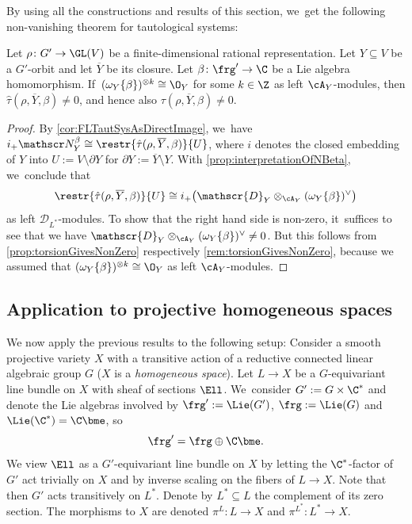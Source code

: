 By using all the constructions and results of this section, we~get the following non-vanishing theorem for tautological systems:

\begin{thm} \label{thm:nonZeroGeneralSetup}
Let $\rho \colon G' \to \GL(V)$ be a finite-dimensional rational representation. Let $Y \subseteq V$ be a $G'$-orbit and let $\overline{Y}$ be its closure. Let $\beta \colon \frg' \to \C$ be a Lie algebra homomorphism. If~$(\omega_Y\{\beta\})^{\otimes k} \cong \O_Y$ for some $k\in \Z$ as left $\cA_Y$\nobreakdash-mod\-ules,
then $\hat{\tau}(\rho, \overline{Y}, \beta) \neq 0$, and hence also $\tau(\rho, \overline{Y}, \beta) \neq 0$.
\end{thm}

\begin{proof}
By \cref{cor:FLTautSysAsDirectImage}, we~have $i_+ \mathscr N_Y^{\beta} \cong \restr{\hat\tau(\rho,\overline Y, \beta)}{U}$, where $i$ denotes the closed embedding of $Y$ into $U := V \setminus \partial Y$ for $\partial Y := \overline Y \setminus Y$. With \cref{prop:interpretationOfNBeta}, we~conclude that
\[
\restr{\hat{\tau}(\rho,\overline Y,\beta)}{U} \cong i_+\big(\mathscr{D}_{Y} \otimes_{\cA_{Y}} (\omega_{Y}\{\beta\})^\vee\big)
\]
as left $\mathscr{D}_{L^*}$\nobreakdash-mod\-ules. To show that the right hand side is non-zero, it~suffices to see that we have $\mathscr{D}_{Y} \otimes_{\cA_{Y}} (\omega_{Y}\{\beta\})^\vee \neq 0$.
But this follows from \cref{prop:torsionGivesNonZero} respectively \cref{rem:torsionGivesNonZero}, because we assumed that $(\omega_{Y}\{\beta\})^{\otimes k} \cong \O_Y$ as left $\cA_Y$\nobreakdash-mod\-ules.
\end{proof}

\subsection{Application to projective homogeneous spaces} \label{ssec:canSheafOnLineBdl}

We now apply the previous results to the following setup: Consider a smooth projective variety $X$ with a transitive action of a reductive connected linear algebraic group $G$ (\ie $X$ is a \emph{homogeneous space}). Let $L \to X$ be a $G$-equivariant line bundle on $X$ with sheaf of sections $\Ell$. We~consider $G' := G \times \C^*$ and denote the Lie algebras involved by $\frg' := \Lie(G')$, $\frg := \Lie(G)$ and $\Lie(\C^*) = \C \bme$, so
\[
\frg' = \frg \oplus \C \bme.
\]
We view $\Ell$ as a $G'$-equivariant line bundle on $X$ by letting the $\C^*$-factor of $G'$ act trivially on $X$ and by inverse scaling on the fibers of $L \to X$. Note that then $G'$ acts transitively on $L^*$.
Denote by $L^* \subseteq L$ the complement of its zero section. The morphisms to $X$ are denoted $\pi^L \colon L \to X$ and $\pi^{L^*} \colon L^* \to X$.

